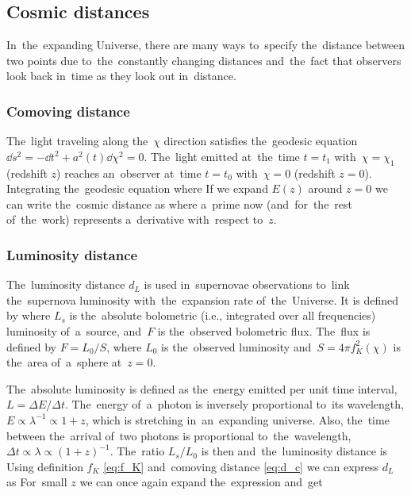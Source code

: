 \subsection{Cosmic distances}
In~the~expanding Universe, there are many ways to~specify the~distance between two points due to~the~constantly changing distances and~the~fact that observers look back in~time as they look out in~distance.
\subsubsection{Comoving distance}
The~light traveling along the~$\chi$ direction satisfies the~geodesic equation $\dd s^2=-\dd t^2+a^2(t)\dd \chi^2=0$. The~light emitted at~the~time $t=t_1$ with~$\chi=\chi_1$ (redshift $z$) reaches an~observer at~time $t=t_0$ with~$\chi=0$ (redshift $z=0$). Integrating the~geodesic equation
where
If we expand $E(z)$ around $z=0$ we can write the~cosmic distance as
where a~prime now (and~for~the~rest of~the~work) represents a~derivative with~respect to~$z$.
\subsubsection{Luminosity distance}
The~luminosity distance $d_L$ is used in~supernovae observations to~link the~supernova luminosity with~the~expansion rate of~the~Universe. It is defined by
where $L_s$ is the~absolute bolometric (i.e., integrated over all frequencies) luminosity of~a~source, and~$F$ is the~observed bolometric flux. The~flux is defined by $F=L_0/S$, where $L_0$ is the~observed luminosity and~$S=4\pi f_K^2(\chi)$ is the~area of~a~sphere at~$z=0$.

The~absolute luminosity is defined as the~energy emitted per unit time interval, $L=\Delta E/\Delta t$. The~energy of~a~photon is inversely proportional to~its wavelength, $E\propto\lambda^{-1}\propto 1+z$, which is stretching in~an~expanding universe. Also, the~time between the~arrival of~two photons is proportional to~the~wavelength, $\Delta t\propto\lambda\propto(1+z)^{-1}$. The~ratio $L_s/L_0$ is then
and~the~luminosity distance is
Using definition \(f_K\) \eqref{eq:f_K} and~comoving distance \eqref{eq:d_c} we can express $d_L$ as
For~small $z$ we can once again expand the~expression and~get
